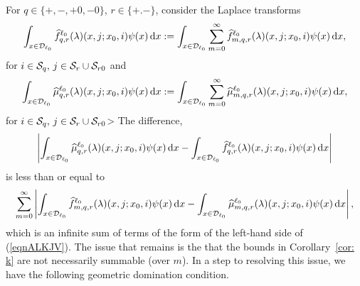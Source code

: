 For \(q\in\{+,-,+0,-0\}\), \(r\in\{+.-\}\), consider the Laplace transforms 
\[\int_{x\in\mathcal{D}_{\ell_0}} \widehat f^{\ell_0}_{q,r}(\lambda)(x,j;x_0,i)\psi(x)\, \mathrm{d} x := \int_{x\in\mathcal{D}_{\ell_0}} \sum_{m=0}^\infty \widehat f^{\ell_0}_{m,q,r}(\lambda)(x,j;x_0,i)\psi(x) \, \mathrm{d} x,\]
for \(i\in\mathcal{S}_q,\,j\in\mathcal{S}_r\cup\mathcal{S}_{r0}\) and 
\[\int_{x\in\mathcal{D}_{\ell_0}} \widehat \mu^{\ell_0}_{q,r}(\lambda)( x,j;x_0,i)\psi(x) \, \mathrm{d} x := \int_{x\in\mathcal{D}_{\ell_0}} \sum_{m=0}^\infty \widehat \mu^{\ell_0}_{m,q,r}(\lambda)( x,j;x_0,i)\psi(x) \, \mathrm{d} x,\]
for \(i\in\mathcal{S}_q,\,j\in\mathcal{S}_r\cup\mathcal{S}_{r0}\)> 
The difference, 
\[\left|\int_{x\in\mathcal{D}_{\ell_0}} \widehat \mu^{\ell_0}_{q,r}(\lambda)( x,j;x_0,i)\psi(x)\, \mathrm{d} x  - \int_{x\in\mathcal{D}_{\ell_0}} \widehat f^{\ell_0}_{q,r}(\lambda)(x,j;x_0,i)\psi(x) \, \mathrm{d} x \right|\] 
is less than or equal to 
\[\sum_{m=0}^\infty \left| \int_{x\in\mathcal{D}_{\ell_0}} \widehat f^{\ell_0}_{m,q,r}(\lambda)(x,j;x_0,i)\psi(x)\, \mathrm{d} x - \int_{x\in\mathcal{D}_{\ell_0}}  \widehat \mu^{\ell_0}_{m,q,r}(\lambda)(x,j;x_0,i)\psi(x) \, \mathrm{d} x\right|,\]
which is an infinite sum of terms of the form of the left-hand side of (\ref{eqnALKJV}). The issue that remains is the that the bounds in Corollary~\ref{cor: k} are not necessarily summable (over \(m\)). In a step to resolving this issue, we have the following geometric domination condition. 
%
